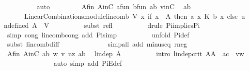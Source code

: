 \begin{isabellebody}
\ \ \ \ \ \ \ \ \isamarkupfalse%
\ auto\ \isanewline
\ \ \ \ \ \ \isamarkupfalse%
\ A{\isacharunderscore}fin\ AinC\ a{\isacharunderscore}fun\ b{\isacharunderscore}fun\ ab\ vinC\ \isamarkupfalse%
\ a{\isacharunderscore}b{\isacharcolon}\isanewline
\ \ \ \ \ \ {\isachardoublequoteopen}LinearCombinations{\isachardot}module{\isachardot}lincomb\ V\ {\isacharparenleft}{\isasymlambda}x{\isachardot}\ if\ x\ {\isasymin}\ A\ then\ a\ x\ {\isasymominus}\isactrlbsub K\isactrlesub \ b\ x\ else\ undefined{\isacharparenright}\ A\ {\isacharequal}\ {\isasymzero}\isactrlbsub V\isactrlesub {\isachardoublequoteclose}\isanewline
\ \ \ \ \ \ \ \ \isamarkupfalse%
\ {\isacharparenleft}subst\ refl{\isacharparenright}\isanewline
\ \ \ \ \ \ \ \ \isamarkupfalse%
\ {\isacharparenleft}drule\ Pi{\isacharunderscore}implies{\isacharunderscore}Pi{}{\isacharparenright}{\isacharplus}\isanewline
\ \ \ \ \ \ \ \ \isamarkupfalse%
\ {\isacharparenleft}simp\ cong{\isacharcolon}\ lincomb{\isacharunderscore}cong\ add{\isacharcolon}\ Pi{\isacharunderscore}simp{\isacharparenright}\isanewline
\ \ \ \ \ \ \ \ \isamarkupfalse%
\ {\isacharparenleft}unfold\ Pi{}{\isacharunderscore}def{\isacharparenright}\isanewline
\ \ \ \ \ \ \ \ \isamarkupfalse%
\ {\isacharparenleft}subst\ lincomb{\isacharunderscore}diff{\isacharparenright}\isanewline
\ \ \ \ \ \ \ \ \ \ \ \ \isamarkupfalse%
\ {\isacharparenleft}simp{\isacharunderscore}all\ add{\isacharcolon}\ minus{\isacharunderscore}eq\ r{\isacharunderscore}neg{\isacharparenright}\ \isanewline
\ \ \ \ \ \ \isamarkupfalse%
\ A{\isacharunderscore}fin\ AinC\ ab\ w\ v\ nz\ a{\isacharunderscore}b\ \isamarkupfalse%
\ {\isachardoublequoteopen}lin{\isacharunderscore}dep\ A{\isachardoublequoteclose}\isanewline
\ \ \ \ \ \ \ \ \isamarkupfalse%
\ {\isacharparenleft}intro\ lin{\isacharunderscore}dep{\isacharunderscore}crit{\isacharbrackleft}\ {\isacharquery}A{\isacharequal}{\isachardoublequoteopen}A{\isachardoublequoteclose}\ \ {\isacharquery}a{\isacharequal}{\isachardoublequoteopen}{\isacharquery}c{\isachardoublequoteclose}\ \ {\isacharquery}v{\isacharequal}{\isachardoublequoteopen}w{\isachardoublequoteclose}{\isacharbrackright}{\isacharparenright}\isanewline
\ \ \ \ \ \ \ \ \ \ \ \ \ \isamarkupfalse%
\ {\isacharparenleft}auto\ simp\ add{\isacharcolon}\ PiE{\isacharunderscore}def{\isacharparenright}\isanewline

\end{isabellebody}
